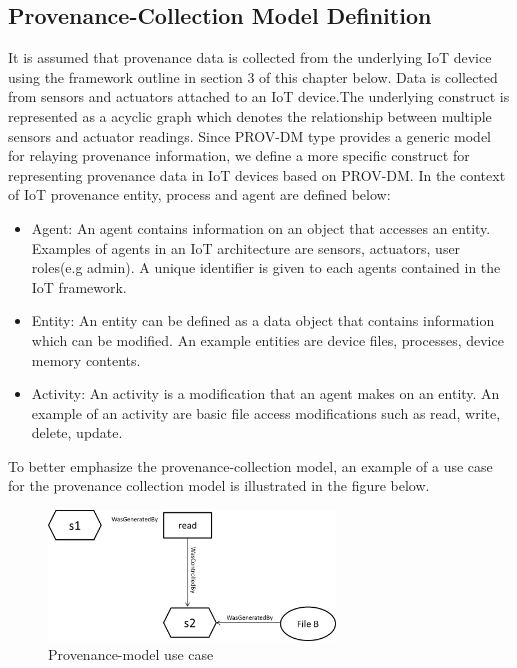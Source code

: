 \subsection{Provenance-Collection Model Definition}

It is assumed that provenance data is collected from the underlying IoT device using the framework outline in section 3 of this chapter below. Data is collected from sensors and actuators attached to an IoT device.The underlying construct is represented as a acyclic graph which denotes the relationship between multiple sensors and actuator readings. Since PROV-DM type provides a generic model for relaying provenance information, we define a more specific construct for representing provenance data in IoT devices based on  PROV-DM. In the context of IoT provenance entity, process and agent are defined below:

\begin{itemize}

\item Agent: An agent contains information on an object that accesses an entity. Examples of agents in an IoT architecture are sensors, actuators, user roles(e.g admin). A unique identifier is given to each agents contained in the IoT framework.

\item Entity:  An entity can be defined as a data object that contains information which can be modified. An example entities are device files, processes, device memory contents.

\item Activity: An activity is a modification that an agent makes on an entity. An example of an activity are basic file access modifications such as read, write, delete, update. 


\end{itemize}


To better emphasize the provenance-collection model, an example of a use case for the provenance collection model is illustrated in the figure below.



\begin{figure}[h]
\begin{center}

\includegraphics[width=3.0in]{usecase_prov.PNG}    
\end{center}
\caption{Provenance-model use case}
\label{autom}
\end{figure}






